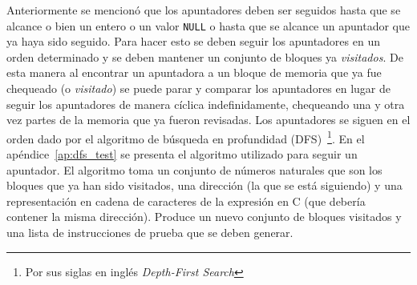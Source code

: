 \begin{comment}
\begin{figure}
\begin{lstlisting}[mathescape=true]
context fixes $\mu$ :: mem begin

partial_function (option) dfs
  :: "nat set $\Rightarrow$ addr $\Rightarrow$ string $\Rightarrow$ (nat set $\times$ test_instr list) option"
  where
  [code]: "dfs D a ca = do {
    let (base,ofs) = a;

    case $\mu$!base of
      None $\Rightarrow$ Some (D,[])
    | Some b $\Rightarrow$ do {
        let ca = adjust_addr ofs ca;
        if base $\notin$ D then do {
          let D = insert base D;
          let emit = [Discover ca base];

          fold_option ($\lambda$i (D,emit). do {
            let i=int i;
            let cval = (ofs_addr i (base_var_name base));
            case b!!i of
              None $\Rightarrow$ Some (D,emit)
            | Some (I v) $\Rightarrow$ Some (D,emit @ [Assert_Eq cval v])
            | Some (NullVal) $\Rightarrow$ Some (D,emit @ [Assert_Eq_Null cval] )
            | Some (A addr) $\Rightarrow$ do {
                (D,emit') $\leftarrow$ dfs D addr cval;
                Some (D,emit@emit')
              }
          })
            [0..<length b]
            (D,emit)

        } else do {
          Some (D,[Assert_Eq_Ptr ca base])
        }
      }
  }"
end
\end{lstlisting}

\caption{DFS para generación de pruebas}
\label{fig:dfs_test}
\end{figure}
\end{comment}

Anteriormente se mencionó que los apuntadores deben ser seguidos hasta que se alcance o bien un entero o un valor \verb|NULL| o hasta que se alcance un apuntador que ya haya sido seguido.
Para hacer esto se deben seguir los apuntadores en un orden determinado y se deben mantener un conjunto de bloques ya \textit{visitados}.
De esta manera al encontrar un apuntadora a un bloque de memoria que ya fue chequeado (o \textit{visitado}) se puede parar y comparar los apuntadores en lugar de seguir los apuntadores de manera cíclica indefinidamente, chequeando una y otra vez partes de la memoria que ya fueron revisadas.
Los apuntadores se siguen en el orden dado por el algoritmo de búsqueda en profundidad (DFS)~\footnote{Por sus siglas en inglés \textit{Depth-First Search}}.
En el apéndice~\ref{ap:dfs_test} se presenta el algoritmo utilizado para seguir un apuntador.
El algoritmo toma un conjunto de números naturales que son los bloques que ya han sido visitados, una dirección (la que se está siguiendo) y una representación en cadena de caracteres de la expresión en C (que debería contener la misma dirección).
Produce un nuevo conjunto de bloques visitados y una lista de instrucciones de prueba que se deben generar.

